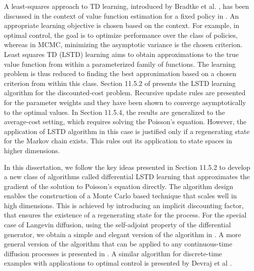 A least-squares approach to TD learning, introduced by Bradtke et al. \cite{brabar96},  has been discussed in the context of value function estimation for a fixed policy in \cite{ctcn}. An appropriate learning objective is chosen based on the context. For example, in optimal control, the goal is to optimize performance over the class of policies, whereas in MCMC, minimizing the asymptotic variance is the chosen criterion. Least squares TD (LSTD) learning aims to obtain approximations to the true value function from within a parameterized family of functions. The learning problem is thus reduced to finding the best approximation based on a chosen criterion from within this class. Section 11.5.2 of \cite{ctcn} presents the LSTD learning algorithm for the discounted-cost problem. Recursive update rules are presented for the parameter weights and they have been shown to converge asymptotically to the optimal values. In Section 11.5.4, the results are generalized to the average-cost setting, which requires solving the Poisson's equation. However, the application of LSTD algorithm in this case is justified only if a regenerating state for the Markov chain exists. This rules out its application to state spaces in higher dimensions.

In this dissertation, we follow the key ideas presented in Section 11.5.2 to develop a new class of algorithms called differential LSTD learning that approximates the gradient of the solution to Poisson's equation directly.  The algorithm design enables the construction of a Monte Carlo based technique that scales well in high dimensions. This is achieved by introducing an implicit discounting factor, that ensures the existence of a regenerating state for the process. For the special case of Langevin diffusion, using the self-adjoint property of the differential generator, we obtain a simple and elegant version of the algorithm in .  A more general version of the algorithm that can be applied to any continuous-time diffusion processes is presented in . 
A similar algorithm for discrete-time examples with applications to optimal control is presented by Devraj et al \cite{devmey16arXiv}.
 
